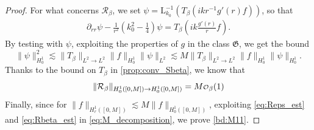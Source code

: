 \documentclass[10pt,a4paper]{amsart}
\def\HH {\dot{H}^1}
\newcommand\smallO{
  \mathchoice
    {{\scriptstyle\mathcal{O}}}%
    {{\scriptstyle\mathcal{O}}}%
    {{\scriptscriptstyle\mathcal{O}}}%
    {\scalebox{.7}{$\scriptscriptstyle\mathcal{O}$}}%
  }
\newcommand{\rmL}{\mathrm{L}}
\begin{document}
\begin{proof}
For what concerns $\mathcal R_\beta$, we set $\psi = \rmL_{k_0}^{-1}\left( T_\beta \left(ik r^{-1} g'(r)f \right)\right)$, so that
\begin{align}
    \partial_{rr} \psi - \frac{1}{r^2} \left(k_0^2-\frac{1}{4}\right) \psi = T_\beta \left(ik \frac{g'(r)}{r}f\right).
\end{align}
By testing with $\psi$, exploiting the properties of $g$ in the class $\mathfrak{G}$, we get the bound
\begin{equation}
\| \psi \|^2_{H^1_0} \lesssim \|T_\beta\|_{L^2\rightarrow L^2} \|f\|_{H^1_0} \|\psi\|_{L^2}\lesssim M\|T_\beta\|_{L^2\rightarrow L^2} \|f\|_{H^1_0} \|\psi\|_{H^1_0}.
\end{equation}
Thanks to the bound on $T_\beta$ in \cref{prop:conv_Sbeta}, we know that
\begin{equation}
\label{eq:Rbeta_est}
 \|\mathcal R_\beta \|_{H^1_0([0,M])\to H^1_0([0,M])} =M\smallO_\beta(1)
\end{equation}
Finally, since for $\|f\|_{H^1_r([0,M])}\lesssim M\|f\|_{H^1_0([0,M])}$, exploiting \cref{eq:Reps_est} and \cref{eq:Rbeta_est} in \cref{eq:M_decomposition}, we prove \cref{bd:M11}.



\end{proof}
\end{document}
